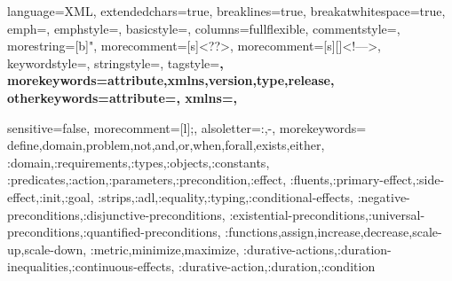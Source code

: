 

 {
    language=XML,
    extendedchars=true, 
    breaklines=true,
    breakatwhitespace=true,
    emph={},
    emphstyle=\color{red},
    basicstyle=\ttfamily,
    columns=fullflexible,
    commentstyle=\color{gray}\upshape,
    morestring=[b]",
    morecomment=[s]{<?}{?>},
    morecomment=[s][\color{forestgreen}]{<!--}{-->},
    keywordstyle=\color{orangered},
    stringstyle=\ttfamily\color{black}\normalfont,
    tagstyle=\color{darkblue}\bf,
    morekeywords={attribute,xmlns,version,type,release},
    otherkeywords={attribute=, xmlns=},
}

{
  sensitive=false,    %
  morecomment=[l]{;}, %
  alsoletter={:,-},   %
  morekeywords={
    define,domain,problem,not,and,or,when,forall,exists,either,
    :domain,:requirements,:types,:objects,:constants,
    :predicates,:action,:parameters,:precondition,:effect,
    :fluents,:primary-effect,:side-effect,:init,:goal,
    :strips,:adl,:equality,:typing,:conditional-effects,
    :negative-preconditions,:disjunctive-preconditions,
    :existential-preconditions,:universal-preconditions,:quantified-preconditions,
    :functions,assign,increase,decrease,scale-up,scale-down,
    :metric,minimize,maximize,
    :durative-actions,:duration-inequalities,:continuous-effects,
    :durative-action,:duration,:condition
  }
}




\lstset{style=mystyle}
